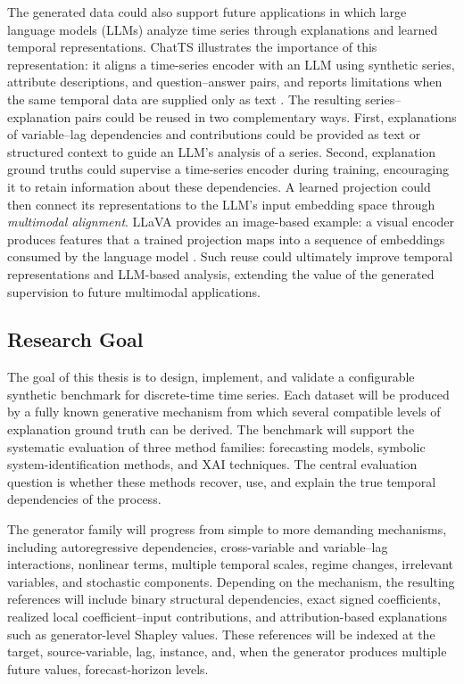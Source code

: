 The generated data could also support future applications in which large
language models (LLMs) analyze time series through explanations and learned
temporal representations. ChatTS
illustrates the importance of this representation: it aligns a time-series
encoder with an LLM using synthetic series, attribute descriptions, and
question--answer pairs, and reports limitations when the same temporal data
are supplied only as text \citep[Sections~3.2--3.5 and 4.6]{xie2025chatts}.
The resulting series--explanation pairs could be reused in two complementary
ways. First,
explanations of variable--lag dependencies and contributions could be provided
as text or structured context to guide an LLM's analysis of a series. Second,
explanation ground truths could supervise a time-series encoder during
training, encouraging it to retain information about these dependencies.
A learned projection could then connect its representations to the LLM's
input embedding space through \emph{multimodal alignment}. LLaVA provides an
image-based example: a visual encoder produces features that a trained
projection maps into a sequence of embeddings consumed by the language model
\citep[Sections~4.1--4.2]{liu2023visual}. Such reuse could ultimately improve
temporal representations and LLM-based analysis, extending the value of the
generated supervision to future multimodal applications.

\subsection{Research Goal}

The goal of this thesis is to design, implement, and validate a configurable
synthetic benchmark for discrete-time time series. Each dataset will be
produced by a fully known generative mechanism from which several compatible
levels of explanation ground truth can be derived. The benchmark will support
the systematic evaluation of three method families: forecasting models,
symbolic system-identification methods, and XAI techniques. The central
evaluation question is whether these methods recover, use, and explain the
true temporal dependencies of the process.

The generator family will progress from simple to more demanding mechanisms,
including autoregressive dependencies, cross-variable and variable--lag
interactions, nonlinear terms, multiple temporal scales, regime changes,
irrelevant variables, and stochastic components. Depending on the mechanism,
the resulting references will include binary structural dependencies, exact
signed coefficients, realized local coefficient--input contributions, and
attribution-based explanations such as generator-level Shapley values. These
references will be indexed at the target, source-variable, lag, instance, and,
when the generator produces multiple future values, forecast-horizon levels.

